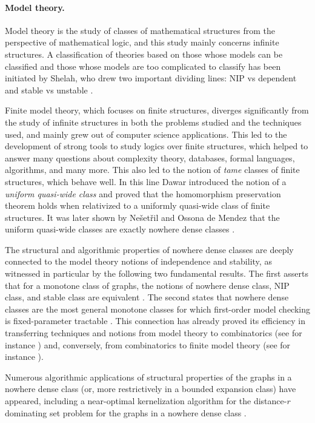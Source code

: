 \paragraph*{Model theory.}
Model theory  is the study of classes of mathematical structures from the perspective of mathematical logic, and this study mainly concerns infinite structures.
A classification of theories based on those whose models can be classified and those whose models are too complicated to classify has been initiated by Shelah, who  drew two important dividing lines: NIP vs dependent and stable vs unstable \cite{shelah1990classification}.

Finite model theory, which focuses on finite structures,  diverges significantly from the study of infinite structures in both the problems studied and the techniques used, and mainly grew out of computer science applications.  This led to the development of strong tools to study logics over finite structures, which helped to answer many questions about  complexity theory, databases, formal languages, algorithms, and many more. This also led to the notion of {\em tame} classes of finite structures, which behave well.  In this line Dawar \cite{Dawar2010} introduced the notion of a \emph{uniform quasi-wide class} and proved 
     that the homomorphism preservation theorem holds when relativized to a uniformly quasi-wide class of finite structures. It was later shown 
by Ne\v{s}et\v{r}il and Ossona de Mendez  that the uniform quasi-wide classes are exactly nowhere dense classes \cite{ND_logic}.

The  structural and algorithmic properties of  nowhere dense classes  are deeply connected to  the model theory notions of independence and stability, as witnessed in particular by the following two fundamental results. The first asserts that for a monotone class of graphs, the notions of nowhere dense class, NIP class, and stable class are equivalent \cite{adler2014interpreting}. The second states that nowhere dense classes are the most general monotone classes for which first-order model checking is fixed-parameter tractable \cite{grohe2017deciding}. This connection has already proved its efficiency in transferring techniques and notions from model theory to combinatorics (see for instance \cite{pilipczuk2018number}) and, conversely, from combinatorics to finite model theory (see for instance \cite{rossman2008homomorphism}).

Numerous algorithmic applications of structural properties of the graphs in a nowhere dense class (or, more restrictively in a bounded expansion class) have appeared, including   a near-optimal kernelization algorithm for the distance-$r$ dominating set problem for the graphs in a nowhere dense class \cite{eickmeyer2016neighborhood}.


